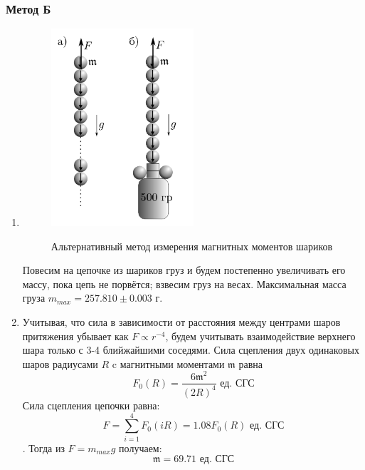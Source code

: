\documentclass[12pt,a4paper]{article}
\newcommand{\mk}{\mathfrak}
\begin{document}
\subsubsection{Метод Б}
\begin{enumerate}
  \item \begin{figure}[H]
    \includegraphics*[width=0.5\textwidth]{2023-10-02-00-43-23.png}
    \label{ust:met_b}
    \caption{Альтернативный ме­тод измерения магнитных
    моментов шариков}
  \end{figure}
  Повесим на цепочке из  шариков груз и будем постепенно увеличивать его массу, пока цепь не порвётся; взвесим груз на весах. Максимальная масса груза $m_{max} = 257.810 \pm 0.003$ г.
  \item Учитывая, что
  сила в зависимости от расстояния между центрами шаров притяжения убывает как $F\varpropto r^{-4}$, будем учитывать взаимодействие верхнего шара только с 3-4 блийжайшими соседями. Сила сцепления двух одинаковых шаров радиусами $R$ c магнитными моментами $\mathfrak{m}$ равна $$F_0(R) = \frac{6\mk m^2}{(2R)^4} \text{ ед. СГС}$$
  Сила сцепления цепочки равна:  
  $$F = \sum_{i=1}^{4} F_0(iR)= 1.08 F_0(R)\text{ ед. СГС}$$. Тогда из $F = m_{max}g$ получаем: $$\mk m = 69.71 \text{ ед. СГС}$$
\end{enumerate}
\end{document}
